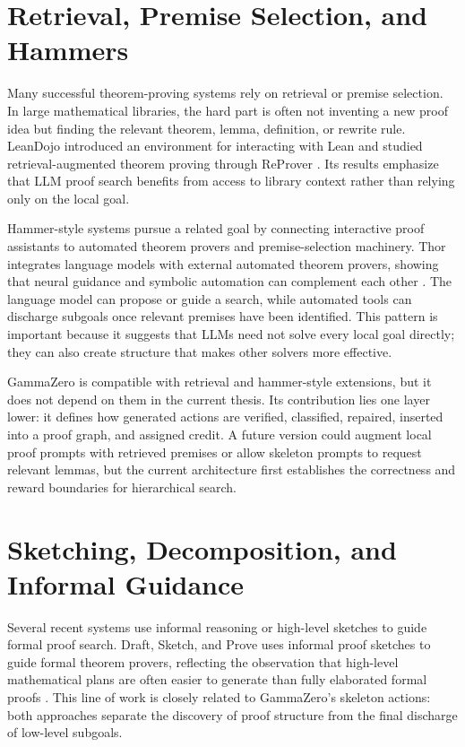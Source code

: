 \documentclass[en]{uet_awesome_thesis/uet-awesome-thesis}
\begin{document}
\section{Retrieval, Premise Selection, and Hammers}

Many successful theorem-proving systems rely on retrieval or premise selection. In large mathematical
libraries, the hard part is often not inventing a new proof idea but finding the relevant theorem, lemma,
definition, or rewrite rule. LeanDojo introduced an environment for interacting with Lean and studied
retrieval-augmented theorem proving through ReProver \citep{yang2023leandojo}. Its results emphasize
that LLM proof search benefits from access to library context rather than relying only on the local goal.

Hammer-style systems pursue a related goal by connecting interactive proof assistants to automated
theorem provers and premise-selection machinery. Thor integrates language models with external
automated theorem provers, showing that neural guidance and symbolic automation can complement each
other \citep{jiang2022thor}. The language model can propose or guide a search, while automated tools can
discharge subgoals once relevant premises have been identified. This pattern is important because it
suggests that LLMs need not solve every local goal directly; they can also create structure that makes
other solvers more effective.

GammaZero is compatible with retrieval and hammer-style extensions, but it does not depend on them in
the current thesis. Its contribution lies one layer lower: it defines how generated actions are verified,
classified, repaired, inserted into a proof graph, and assigned credit. A future version could augment
local proof prompts with retrieved premises or allow skeleton prompts to request relevant lemmas,
but the current architecture first establishes the correctness and reward boundaries for hierarchical
search.

\section{Sketching, Decomposition, and Informal Guidance}

Several recent systems use informal reasoning or high-level sketches to guide formal proof search.
Draft, Sketch, and Prove uses informal proof sketches to guide formal theorem provers, reflecting the
observation that high-level mathematical plans are often easier to generate than fully elaborated formal
proofs \citep{jiang2022draft}. This line of work is closely related to GammaZero's skeleton actions: both
approaches separate the discovery of proof structure from the final discharge of low-level subgoals.
\end{document}
